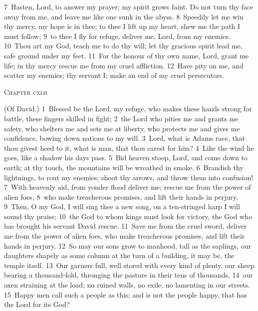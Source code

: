 \documentclass[10pt]{book} %
\begin{document}
\textcolor{benred8}{7}~Hasten, Lord, to answer my prayer; my spirit grows faint. Do not turn thy face away from me, and leave me like one sunk in the abyss. \textcolor{benred8}{8}~Speedily let me win thy mercy, my hope is in thee; to thee I lift up my heart, shew me the path I must follow; \textcolor{benred8}{9}~to thee I fly for refuge, deliver me, Lord, from my enemies. \textcolor{benred8}{10}~Thou art my God, teach me to do thy will; let thy gracious spirit lead me, safe ground under my feet. \textcolor{benred8}{11}~For the honour of thy own name, Lord, grant me life; in thy mercy rescue me from my cruel affliction. \textcolor{benred8}{12}~Have pity on me, and scatter my enemies; thy servant I; make an end of my cruel persecutors.
\begin{large}\begin{center}\textsc{Chapter cxlii}\end{center}\end{large}
(Of David.)
\textcolor{benred8}{1}~Blessed be the Lord, my refuge, who makes these hands strong for battle, these fingers skilled in fight; \textcolor{benred8}{2}~the Lord who pities me and grants me safety, who shelters me and sets me at liberty, who protects me and gives me confidence, bowing down nations to my will. \textcolor{benred8}{3}~Lord, what is Adam\textquotesingle s race, that thou givest heed to it, what is man, that thou carest for him? \textcolor{benred8}{4}~Like the wind he goes, like a shadow his days pass.
\textcolor{benred8}{5}~Bid heaven stoop, Lord, and come down to earth; at thy touch, the mountains will be wreathed in smoke. \textcolor{benred8}{6}~Brandish thy lightnings, to rout my enemies; shoot thy arrows, and throw them into confusion! \textcolor{benred8}{7}~With heavenly aid, from yonder flood deliver me; rescue me from the power of alien foes, \textcolor{benred8}{8}~who make treacherous promises, and lift their hands in perjury. \textcolor{benred8}{9}~Then, O my God, I will sing thee a new song, on a ten-stringed harp I will sound thy praise; \textcolor{benred8}{10}~the God to whom kings must look for victory, the God who has brought his servant David rescue. \textcolor{benred8}{11}~Save me from the cruel sword, deliver me from the power of alien foes, who make treacherous promises, and lift their hands in perjury.
\textcolor{benred8}{12}~So may our sons grow to manhood, tall as the saplings, our daughters shapely as some column at the turn of a building, it may be, the temple itself. \textcolor{benred8}{13}~Our garners full, well stored with every kind of plenty, our sheep bearing a thousand-fold, thronging the pasture in their tens of thousands, \textcolor{benred8}{14}~our oxen straining at the load; no ruined walls, no exile, no lamenting in our streets. \textcolor{benred8}{15}~Happy men call such a people as this; and is not the people happy, that has the Lord for its God?
\end{document}
